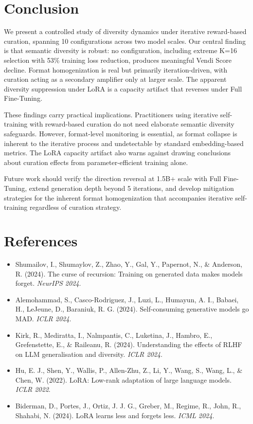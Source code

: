 \documentclass[11pt,a4paper]{article}
\begin{document}
\section{Conclusion}

We present a controlled study of diversity dynamics under iterative reward-based curation, spanning 10 configurations across two model scales. Our central finding is that semantic diversity is robust: no configuration, including extreme K=16 selection with 53\% training loss reduction, produces meaningful Vendi Score decline. Format homogenization is real but primarily iteration-driven, with curation acting as a secondary amplifier only at larger scale. The apparent diversity suppression under LoRA is a capacity artifact that reverses under Full Fine-Tuning.

These findings carry practical implications. Practitioners using iterative self-training with reward-based curation do not need elaborate semantic diversity safeguards. However, format-level monitoring is essential, as format collapse is inherent to the iterative process and undetectable by standard embedding-based metrics. The LoRA capacity artifact also warns against drawing conclusions about curation effects from parameter-efficient training alone.

Future work should verify the direction reversal at 1.5B+ scale with Full Fine-Tuning, extend generation depth beyond 5 iterations, and develop mitigation strategies for the inherent format homogenization that accompanies iterative self-training regardless of curation strategy.

\section*{References}

\begin{itemize}
\item Shumailov, I., Shumaylov, Z., Zhao, Y., Gal, Y., Papernot, N., \& Anderson, R. (2024). The curse of recursion: Training on generated data makes models forget. \textit{NeurIPS 2024}.
\item Alemohammad, S., Casco-Rodriguez, J., Luzi, L., Humayun, A. I., Babaei, H., LeJeune, D., Baraniuk, R. G. (2024). Self-consuming generative models go MAD. \textit{ICLR 2024}.
\item Kirk, R., Mediratta, I., Nalmpantis, C., Luketina, J., Hambro, E., Grefenstette, E., \& Raileanu, R. (2024). Understanding the effects of RLHF on LLM generalisation and diversity. \textit{ICLR 2024}.
\item Hu, E. J., Shen, Y., Wallis, P., Allen-Zhu, Z., Li, Y., Wang, S., Wang, L., \& Chen, W. (2022). LoRA: Low-rank adaptation of large language models. \textit{ICLR 2022}.
\item Biderman, D., Portes, J., Ortiz, J. J. G., Greber, M., Regime, R., John, R., Shahabi, N. (2024). LoRA learns less and forgets less. \textit{ICML 2024}.
\end{itemize}
\end{document}
